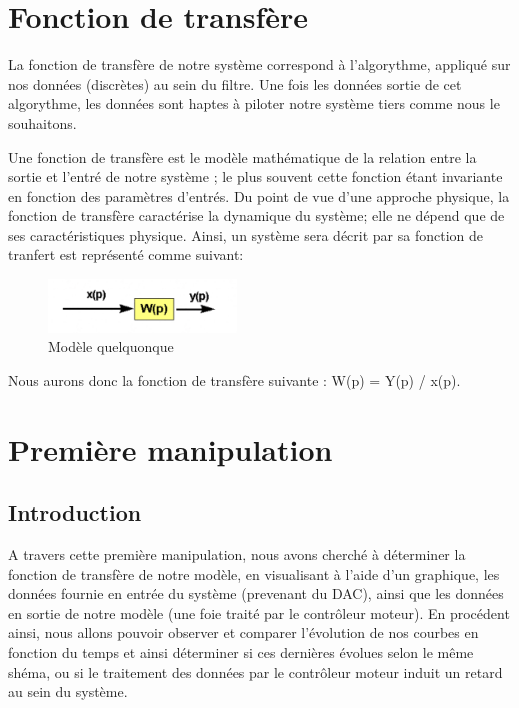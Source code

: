 \documentclass[french,a4paper,12pt]{report}
\begin{document}
		
	\section{Fonction de transfère}
	
		La fonction de transfère de notre système correspond à l'algorythme, appliqué sur nos données (discrètes) au sein du filtre. Une fois les données sortie de cet algorythme, les données sont haptes à piloter notre système tiers comme nous le souhaitons.
		
		Une fonction de transfère est le modèle mathématique de la relation entre la sortie et l'entré de notre système ; le plus souvent cette fonction étant invariante en fonction des paramètres d'entrés.
		Du point de vue d'une approche physique, la fonction de transfère caractérise la dynamique du système; elle ne dépend que de ses caractéristiques physique. 
		Ainsi, un système sera décrit par sa fonction de tranfert est représenté comme suivant:

	\begin{figure}[!ht]
    \center
  	\includegraphics[width=5cm]{transf1.png}
    \caption{Modèle quelquonque}
	\end{figure}
	
	Nous aurons donc la fonction de transfère suivante : W(p) = Y(p) / x(p).
	
	\newpage
	
	\section{Première manipulation}
	
		\subsection{Introduction}
	
		A travers cette première manipulation, nous avons cherché à déterminer la fonction de transfère de notre modèle, en visualisant à l'aide d'un graphique, les données fournie en entrée du système (prevenant du DAC), ainsi que les données en sortie de notre modèle (une foie traité par le contrôleur moteur).
		En procédent ainsi, nous allons pouvoir observer et comparer l'évolution de nos courbes en fonction du temps et ainsi déterminer si ces dernières évolues selon le même shéma, ou si le traitement des données par le contrôleur moteur induit un retard au sein du système.
		
\end{document}
